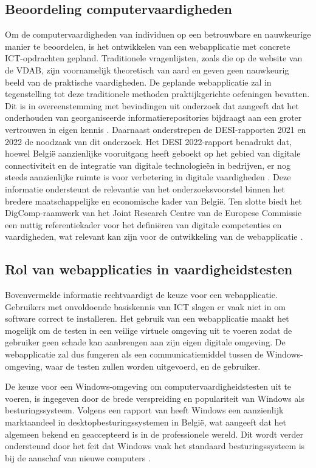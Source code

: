 \subsection{Beoordeling computervaardigheden}
Om de computervaardigheden van individuen op een betrouwbare en nauwkeurige manier te beoordelen, is het ontwikkelen van een webapplicatie met concrete ICT-opdrachten gepland. Traditionele vragenlijsten, zoals die op de website van de VDAB, zijn voornamelijk theoretisch van aard en geven geen nauwkeurig beeld van de praktische vaardigheden.
De geplande webapplicatie zal in tegenstelling tot deze traditionele methoden praktijkgerichte oefeningen bevatten. Dit is in overeenstemming met bevindingen uit onderzoek dat aangeeft dat het onderhouden van georganiseerde informatierepositories bijdraagt aan een groter vertrouwen in eigen kennis \autocite{JudgingKnowledge}.
Daarnaast onderstrepen de DESI-rapporten 2021 en 2022 de noodzaak van dit onderzoek. Het DESI 2022-rapport benadrukt dat, hoewel België aanzienlijke vooruitgang heeft geboekt op het gebied van digitale connectiviteit en de integratie van digitale technologieën in bedrijven, er nog steeds aanzienlijke ruimte is voor verbetering in digitale vaardigheden \autocite{DESIRaport}. Deze  informatie ondersteunt de relevantie van het onderzoeksvoorstel binnen het bredere maatschappelijke en economische kader van België.
Ten slotte biedt het DigComp-raamwerk van het Joint Research Centre van de Europese Commissie een nuttig referentiekader voor het definiëren van digitale competenties en vaardigheden, wat relevant kan zijn voor de ontwikkeling van de webapplicatie \autocite{DigCompFramework}.

\subsection{Rol van webapplicaties in vaardigheidstesten}
Bovenvermelde informatie rechtvaardigt de k\-euze voor een webapplicatie. Gebruikers met onvoldoende basiskennis van ICT slagen er vaak niet in om software correct te installeren. Het gebruik van een webapplicatie maakt het mogelijk om de testen in een veilige virtuele omgeving uit te voeren zodat de gebruiker geen schade kan aanbrengen aan zijn eigen digitale omgeving. De webapplicatie zal dus fungeren als een communicatiemiddel tussen de Windows-omgeving, waar de testen zullen worden uitgevoerd, en de gebruiker.

De keuze voor een Windows-omgeving om computervaardigheidstesten uit te voeren, is ingegeven door de brede verspreiding en populariteit van Windows als besturingssysteem. Volgens een rapport van \textcite{StatCounterOSMarketShare} heeft Windows een aanzienlijk marktaandeel in desktopbesturingssystemen in België, wat aangeeft dat het algemeen bekend en geaccepteerd is in de professionele wereld. Dit wordt verder ondersteund door het feit dat Windows vaak het standaard besturingssysteem is bij de aanschaf van nieuwe computers \autocite{ProfolusWindowsPopularity}.

